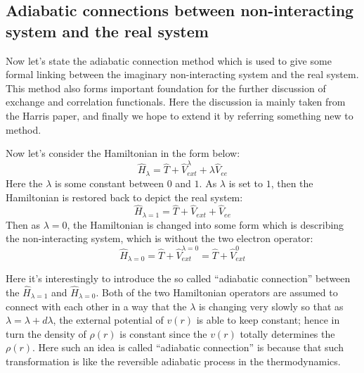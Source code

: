 \subsection{Adiabatic connections between non-interacting system
and the real system}
\label{Adiabatic_connections}
%
%
%
%
Now let's state the adiabatic connection method which is used to
give some formal linking between the imaginary non-interacting
system and the real system\cite{0305-4608-4-8-013, PhysRevA.29.1648,
yang:10107, Savin2003}. This method also forms important foundation
for the further discussion of exchange and correlation
functionals\cite{PhysRevB.13.4274, Ernzerhof1996499}. Here the
discussion ia mainly taken from the Harris
paper\cite{PhysRevA.29.1648}, and finally we hope to extend it by
referring something new to method\cite{yang:10107}.

Now let's consider the Hamiltonian in the form below:
\begin{equation}\label{}
\hat{H}_{\lambda} = \hat{T} + \hat{V}^{\lambda}_{ext} +
\lambda\hat{V}_{ee}
\end{equation}
Here the $\lambda$ is some constant between $0$ and $1$. As
$\lambda$ is set to $1$, then the Hamiltonian is restored back to
depict the real system:
\begin{equation}\label{}
\hat{H}_{\lambda = 1} = \hat{T} + \hat{V}_{ext} + \hat{V}_{ee}
\end{equation}
Then as $\lambda = 0$, the Hamiltonian is changed into some form
which is describing the non-interacting system, which is without the
two electron operator:
\begin{equation}\label{}
\hat{H}_{\lambda = 0} = \hat{T} + \hat{V}^{\lambda = 0}_{ext} =
\hat{T} + \hat{V}^{0}_{ext}
\end{equation}

Here it's interestingly to introduce the so called ``adiabatic
connection'' between the $\hat{H}_{\lambda = 1}$ and
$\hat{H}_{\lambda = 0}$. Both of the two Hamiltonian operators are
assumed to connect with each other in a way that the $\lambda$ is
changing very slowly so that as $\lambda = \lambda + d\lambda$, the
external potential of $v(r)$ is able to keep constant; hence in turn
the density of $\rho(r)$ is constant since the $v(r)$ totally
determines the $\rho(r)$. Here such an idea is called ``adiabatic
connection'' is because that such transformation is like the
reversible adiabatic process in the thermodynamics.

